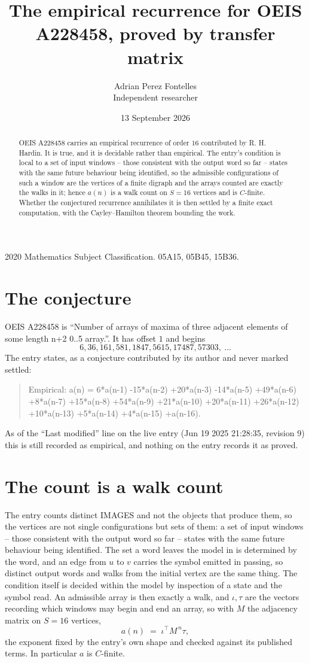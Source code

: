 \documentclass[11pt,a4paper]{article}
\title{The empirical recurrence for OEIS A228458, proved by transfer matrix}
\author{Adrian Perez Fontelles\\ \small Independent researcher}
\date{13 September 2026}
\theoremstyle{plain}
\theoremstyle{definition}
\begin{document}
\maketitle

\begin{abstract}
OEIS A228458 carries an empirical recurrence of order $16$ contributed by R. H. Hardin. It is
true, and it is decidable rather than empirical. The entry's condition is local to a set of input windows -- those consistent with the output word so far -- states with the same future behaviour being identified, so
the admissible configurations of such a window are the vertices of a finite digraph and the
arrays counted are exactly the walks in it; hence $a(n)$ is a walk count on $S=16$ vertices
and is $C$-finite. Whether the conjectured recurrence annihilates it is then settled by a
finite exact computation, with the Cayley--Hamilton theorem bounding the work.
\end{abstract}

\noindent\small 2020 Mathematics Subject Classification. 05A15, 05B45, 15B36.\normalsize

\section{The conjecture}

OEIS A228458 is ``Number of arrays of maxima of three adjacent elements of some length n+2 0..5 array.''. It has offset $1$ and begins
\[
6, 36, 161, 581, 1847, 5615, 17487, 57303,\ \dots
\]
The entry states, as a conjecture contributed by its author and never marked settled:
\begin{quote}
Empirical: a(n) = 6*a(n-1) -15*a(n-2) +20*a(n-3) -14*a(n-5) +49*a(n-6) +8*a(n-7) +15*a(n-8) +54*a(n-9) +21*a(n-10) +20*a(n-11) +26*a(n-12) +10*a(n-13) +5*a(n-14) +4*a(n-15) +a(n-16).
\end{quote}
As of the ``Last modified'' line on the live entry (Jun 19 2025 21:28:35, revision 9) this is still
recorded as empirical, and nothing on the entry records it as proved.

\section{The count is a walk count}

The entry counts distinct IMAGES and not the objects that produce them, so the vertices are not single configurations but sets of them: a set of input windows -- those consistent with the output word so far -- states with the same future behaviour being identified. The set a word leaves the model in is determined by the word, and an edge from $u$ to $v$ carries the symbol emitted in passing, so distinct output words and walks from the initial vertex are the same thing. The condition itself is decided within the model by inspection of a state and the symbol read.
An admissible array is then exactly a walk, and $\iota,\tau$ are the vectors recording which windows may begin and end an array, so with $M$ the adjacency matrix on $S=16$ vertices,
\[
a(n)\;=\;\iota^{\!\top}M^{\,n}\tau ,
\]
the exponent fixed by the entry's own shape and checked against its published terms. In
particular $a$ is $C$-finite.
\end{document}

